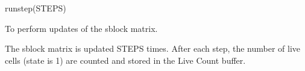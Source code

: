 

\format

runstep(STEPS)

\purpose

To perform updates of the sblock matrix.

\description

The sblock matrix is updated STEPS times.
After each step, the number of live cells (state is 1) are counted and stored in the Live Count buffer.
